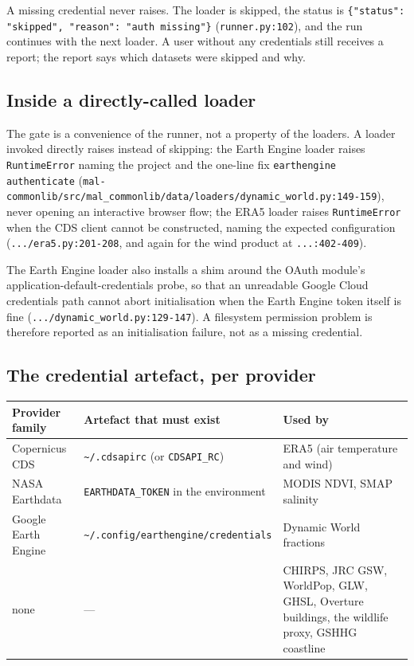 \documentclass[11pt,a4paper]{article}
\newcommand{\code}[1]{\texttt{#1}}
\begin{document}
A missing credential never raises. The loader is skipped, the status is
\code{\{"status": "skipped", "reason": "auth missing"\}}
(\code{runner.py:102}), and the run continues with the next loader. A user
without any credentials still receives a report; the report says which
datasets were skipped and why.

\subsection{Inside a directly-called loader}

The gate is a convenience of the runner, not a property of the loaders. A
loader invoked directly raises instead of skipping: the Earth Engine loader
raises \code{RuntimeError} naming the project and the one-line fix
\code{earthengine authenticate}
(\code{mal-commonlib/src/mal\_commonlib/data/loaders/dynamic\_world.py:149-159}),
never opening an interactive browser flow; the ERA5 loader raises
\code{RuntimeError} when the CDS client cannot be constructed, naming the
expected configuration (\code{.../era5.py:201-208}, and again for the wind
product at \code{...:402-409}).

The Earth Engine loader also installs a shim around the OAuth module's
application-default-credentials probe, so that an unreadable Google Cloud
credentials path cannot abort initialisation when the Earth Engine token
itself is fine (\code{.../dynamic\_world.py:129-147}). A filesystem permission
problem is therefore reported as an initialisation failure, not as a missing
credential.

\subsection{The credential artefact, per provider}

\small
\begin{longtable}{@{}lp{5.4cm}p{}@{}}
\toprule
Provider family & Artefact that must exist & Used by \\
\midrule
\endhead
Copernicus CDS & \code{\textasciitilde/.cdsapirc} (or \code{CDSAPI\_RC}) &
ERA5 (air temperature and wind) \\
NASA Earthdata & \code{EARTHDATA\_TOKEN} in the environment & MODIS NDVI,
SMAP salinity \\
Google Earth Engine &
\code{\textasciitilde/.config/\allowbreak earthengine/\allowbreak credentials}
& Dynamic World fractions \\
none & --- & CHIRPS, JRC GSW, WorldPop, GLW, GHSL, Overture buildings, the
wildlife proxy, GSHHG coastline \\
\bottomrule
\end{longtable}
\normalsize
\end{document}

